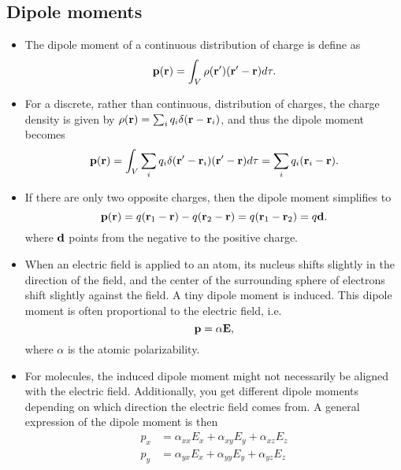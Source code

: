\documentclass[11pt]{article}
\begin{document}
\subsection{Dipole moments}
\begin{itemize}
    \item The dipole moment of a continuous distribution of charge is define as
    \begin{equation}
        \mathbf{p}(\mathbf{r}) = \int_V \rho(\mathbf{r}')(\mathbf{r}' - \mathbf{r}) d\tau.
    \end{equation}
    \item For a discrete, rather than continuous, distribution of charges, the charge density is given by $\rho(\mathbf{r}) = \sum_i q_i \delta(\mathbf{r} - \mathbf{r}_i)$, and thus the dipole moment becomes
    \begin{equation}
        \mathbf{p}(\mathbf{r}) = \int_V \sum_i q_i \delta(\mathbf{r}' - \mathbf{r}_i) (\mathbf{r}' - \mathbf{r}) d\tau = \sum_i q_i (\mathbf{r}_i - \mathbf{r}).
    \end{equation}
    \item If there are only two opposite charges, then the dipole moment simplifies to
    \begin{equation}
        \mathbf{p}(\mathbf{r}) = q (\mathbf{r}_1 - \mathbf{r}) - q(\mathbf{r}_2 - \mathbf{r}) = q (\mathbf{r}_1 - \mathbf{r}_2) = q \mathbf{d}.
    \end{equation}
    where $\mathbf{d}$ points from the negative to the positive charge.
    \item When an electric field is applied to an atom, its nucleus shifts slightly in the direction of the field, and the center of the surrounding sphere of electrons shift slightly against the field. A tiny dipole moment is induced. This dipole moment is often proportional to the electric field, i.e.
    \begin{equation}
        \mathbf{p} = \alpha \mathbf{E},
    \end{equation}
    where $\alpha$ is the atomic polarizability.
    \item For molecules, the induced dipole moment might not necessarily be aligned with the electric field. Additionally, you get different dipole moments depending on which direction the electric field comes from. A general expression of the dipole moment is then
    \begin{align}
         p_x &= \alpha_{xx} E_x + \alpha_{xy} E_y + \alpha_{xz} E_z \nonumber \\
         p_y &= \alpha_{yx} E_x + \alpha_{yy} E_y + \alpha_{yz} E_z\nonumber \\

\end{align}
\end{itemize}
\end{document}
